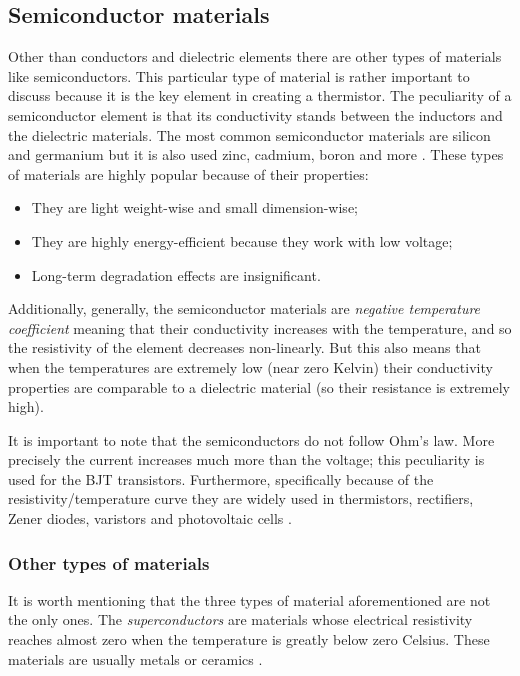 \subsection{Semiconductor materials}
Other than conductors and dielectric elements there are other types of materials like semiconductors. This particular type of material is rather important to discuss because it is the key element in creating a thermistor. The peculiarity of a semiconductor element is that its conductivity stands between the inductors and the dielectric materials. The most common semiconductor materials are silicon and germanium but it is also used zinc, cadmium, boron and more \cite{Gupta20163}. These types of materials are highly popular because of their properties:
\vspace{-3px}\begin{itemize}
\renewcommand*{\labelitemi}{$\circ$}
\setlength{\itemsep}{-2px}
    \item They are light weight-wise and small dimension-wise;
    \item They are highly energy-efficient because they work with low voltage;
    \item Long-term degradation effects are insignificant.
\end{itemize}

\noindent Additionally, generally, the semiconductor materials are \textsl{negative temperature coefficient} meaning that their conductivity increases with the temperature, and so the resistivity of the element decreases non-linearly. But this also means that when the temperatures are extremely low (near zero Kelvin) their conductivity properties are comparable to a dielectric material (so their resistance is extremely high).

It is important to note that the semiconductors do not follow Ohm's law. More precisely the current increases much more than the voltage; this peculiarity is used for the BJT transistors. Furthermore, specifically because of the resistivity/temperature curve they are widely used in thermistors, rectifiers, Zener diodes, varistors and photovoltaic cells \cite{Gupta20163}.


\subsubsection*{Other types of materials}
It is worth mentioning that the three types of material aforementioned are not the only ones. The \textsl{superconductors} are materials whose electrical resistivity reaches almost zero when the temperature is greatly below zero Celsius. These materials are usually metals or ceramics \cite{Gupta20163}.

